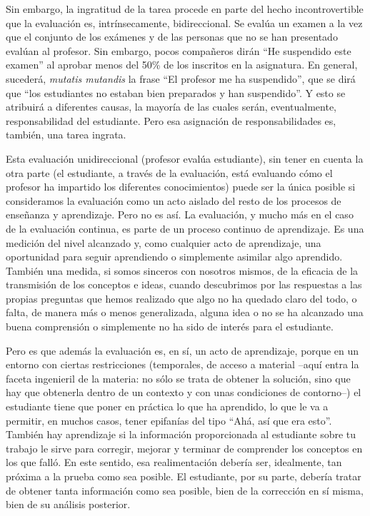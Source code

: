 \documentclass[twoside,10pt]{article}
\begin{document}
\begin{multicols}{2}
Sin embargo, la ingratitud de la tarea procede en parte del hecho
incontrovertible que la evaluación es, intrínsecamente,
bidireccional. Se evalúa un examen a la vez que el conjunto de los
exámenes y de las personas que no se han presentado evalúan al
profesor. Sin embargo, pocos compañeros dirán ``He suspendido este
examen'' al aprobar menos del 50\% de los inscritos en la
asignatura. En general, sucederá, {\em mutatis mutandis} la frase ``El
profesor me ha suspendido'', que se dirá que ``los estudiantes no
estaban bien preparados y han suspendido''. Y esto se atribuirá a
diferentes causas, la mayoría de las cuales serán, eventualmente,
responsabilidad del estudiante. Pero esa asignación de
responsabilidades es, también, una tarea ingrata. 

Esta evaluación unidireccional (profesor evalúa estudiante), sin tener
en cuenta la otra parte (el estudiante, a través de la evaluación,
está evaluando cómo el profesor ha impartido los diferentes
conocimientos) puede ser la única posible si consideramos la
evaluación como un acto aislado del resto de los procesos de enseñanza
y aprendizaje. Pero no es así. La evaluación, y
mucho más en el caso de la evaluación continua, es parte de un proceso
continuo de aprendizaje. Es una medición del nivel alcanzado y, como
cualquier acto de aprendizaje, una oportunidad para seguir aprendiendo
o simplemente asimilar algo aprendido. También una medida, si somos
sinceros con nosotros mismos, de la eficacia de la transmisión de los
conceptos e ideas, cuando descubrimos por las respuestas a las propias
preguntas que hemos realizado que algo no ha quedado claro del todo, o
falta, de manera más o menos generalizada, alguna idea o no se ha
alcanzado una buena comprensión o simplemente no ha sido de interés
para el estudiante. 

\noindent 
\bigskip

Pero es que además la evaluación es, en sí, un acto de aprendizaje,
porque en un entorno 
con ciertas restricciones (temporales, de acceso a material --aquí entra la faceta ingenieril de la materia: no sólo se trata de obtener la solución, sino que hay que obtenerla dentro de un contexto y con unas condiciones de contorno--) el
estudiante tiene que poner en práctica lo que ha aprendido, lo que le
va a permitir, en muchos casos, tener epifanías del tipo ``Ahá, así
que era esto''.
También hay aprendizaje si la información proporcionada al estudiante sobre tu
trabajo le sirve para corregir, mejorar y terminar de comprender los conceptos
en los que falló.
En este sentido, esa realimentación debería ser, idealmente, tan próxima a la
prueba como sea posible. El estudiante, por su parte, debería tratar de obtener
tanta información como sea posible, bien de la corrección en sí misma, bien de
su análisis posterior.


\end{multicols}
\end{document}
